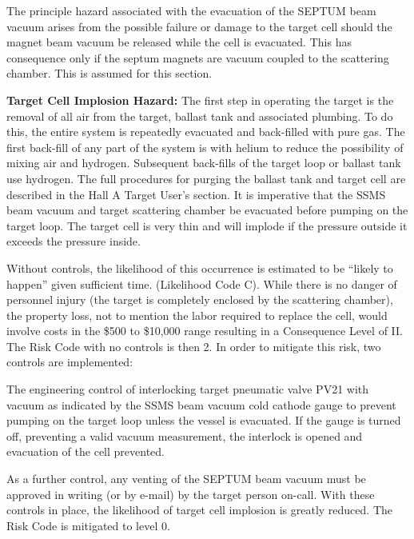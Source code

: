 {The principle hazard associated with the evacuation of the SEPTUM beam vacuum arises from the possible 
failure or damage to the target cell should the magnet beam vacuum be released while the cell is evacuated. 
This has consequence only if the septum magnets are vacuum coupled to the scattering chamber. This is 
assumed for this section. 

{\bf Target Cell Implosion Hazard:}
The first step in operating the target is the removal of all air from the target, ballast tank and
associated plumbing. To do this, the entire system is repeatedly evacuated and back-filled with pure 
gas. The first back-fill of any part of the system is with helium to reduce the possibility of mixing 
air and hydrogen. Subsequent back-fills of the target loop or ballast tank use hydrogen. The full 
procedures for purging the ballast tank and target cell are described in the Hall A Target User's section. 
It is imperative that the SSMS beam vacuum and target scattering chamber be evacuated before pumping on 
the target loop. The target cell is very thin and will implode if the pressure outside it exceeds the 
pressure inside.

Without controls, the likelihood of this occurrence is estimated to be ``likely to happen'' given 
sufficient time. (Likelihood Code C).  While there is no danger of personnel injury (the target is 
completely enclosed by the scattering chamber), the property loss, not to mention the labor required 
to replace the cell, would involve costs in the \$500 to \$10,000 range resulting in a Consequence 
Level of II.  The Risk Code with no controls is then 2.  In order to mitigate this risk, two controls 
are implemented: 
\begin{list}{.~}{\setlength{\itemsep}{-0.15cm}}
   \item The engineering control of interlocking target pneumatic valve PV21 with vacuum 
       as indicated by the SSMS  beam vacuum cold cathode gauge to prevent pumping on the target loop unless 
       the vessel is evacuated.  If the gauge is turned off, preventing a valid vacuum measurement, the 
       interlock is opened and evacuation of the cell prevented.
   \item As a further control, any venting of 
       the SEPTUM beam vacuum must be approved in writing (or by e-mail) by the target person on-call.  
       With these controls in place, the likelihood of target cell implosion is greatly reduced.  The Risk 
       Code is mitigated to level 0.
\end{list}

}
